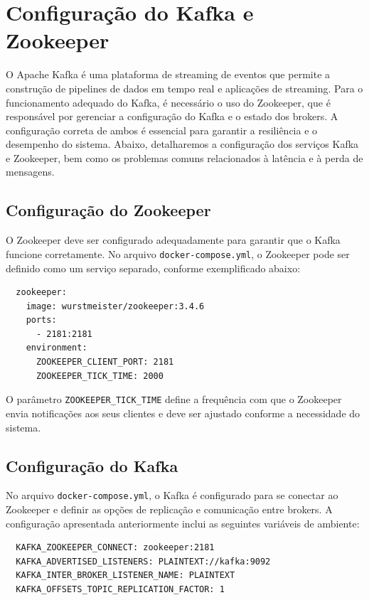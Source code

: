 \section{Configuração do Kafka e Zookeeper}

O Apache Kafka é uma plataforma de streaming de eventos que permite a construção de pipelines de dados em tempo real e aplicações de streaming. Para o funcionamento adequado do Kafka, é necessário o uso do Zookeeper, que é responsável por gerenciar a configuração do Kafka e o estado dos brokers. A configuração correta de ambos é essencial para garantir a resiliência e o desempenho do sistema. Abaixo, detalharemos a configuração dos serviços Kafka e Zookeeper, bem como os problemas comuns relacionados à latência e à perda de mensagens.

\subsection{Configuração do Zookeeper}
O Zookeeper deve ser configurado adequadamente para garantir que o Kafka funcione corretamente. No arquivo \texttt{docker-compose.yml}, o Zookeeper pode ser definido como um serviço separado, conforme exemplificado abaixo:

\begin{verbatim}
  zookeeper:
    image: wurstmeister/zookeeper:3.4.6
    ports:
      - 2181:2181
    environment:
      ZOOKEEPER_CLIENT_PORT: 2181
      ZOOKEEPER_TICK_TIME: 2000
\end{verbatim}

O parâmetro \texttt{ZOOKEEPER\_TICK\_TIME} define a frequência com que o Zookeeper envia notificações aos seus clientes e deve ser ajustado conforme a necessidade do sistema.

\subsection{Configuração do Kafka}
No arquivo \texttt{docker-compose.yml}, o Kafka é configurado para se conectar ao Zookeeper e definir as opções de replicação e comunicação entre brokers. A configuração apresentada anteriormente inclui as seguintes variáveis de ambiente:

\begin{verbatim}
  KAFKA_ZOOKEEPER_CONNECT: zookeeper:2181
  KAFKA_ADVERTISED_LISTENERS: PLAINTEXT://kafka:9092
  KAFKA_INTER_BROKER_LISTENER_NAME: PLAINTEXT
  KAFKA_OFFSETS_TOPIC_REPLICATION_FACTOR: 1
\end{verbatim}

